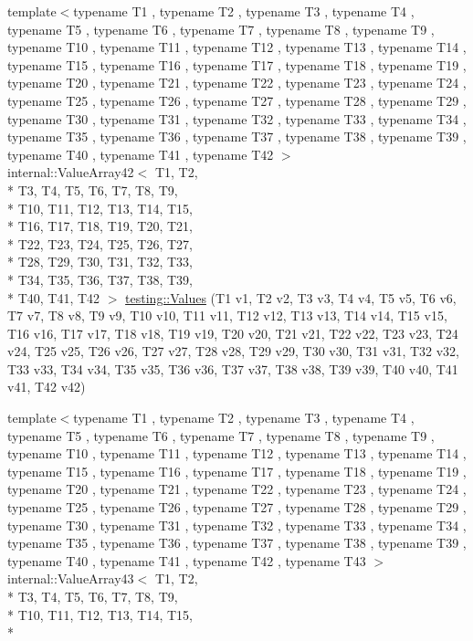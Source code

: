 \begin{DoxyCompactItemize}
{\footnotesize template$<$typename T1 , typename T2 , typename T3 , typename T4 , typename T5 , typename T6 , typename T7 , typename T8 , typename T9 , typename T10 , typename T11 , typename T12 , typename T13 , typename T14 , typename T15 , typename T16 , typename T17 , typename T18 , typename T19 , typename T20 , typename T21 , typename T22 , typename T23 , typename T24 , typename T25 , typename T26 , typename T27 , typename T28 , typename T29 , typename T30 , typename T31 , typename T32 , typename T33 , typename T34 , typename T35 , typename T36 , typename T37 , typename T38 , typename T39 , typename T40 , typename T41 , typename T42 $>$ }\\internal\-::\-Value\-Array42$<$ T1, T2, \\*
T3, T4, T5, T6, T7, T8, T9, \\*
T10, T11, T12, T13, T14, T15, \\*
T16, T17, T18, T19, T20, T21, \\*
T22, T23, T24, T25, T26, T27, \\*
T28, T29, T30, T31, T32, T33, \\*
T34, T35, T36, T37, T38, T39, \\*
T40, T41, T42 $>$ \hyperlink{namespacetesting_a0951fc3989cde27914791eb120f8f01c}{testing\-::\-Values} (T1 v1, T2 v2, T3 v3, T4 v4, T5 v5, T6 v6, T7 v7, T8 v8, T9 v9, T10 v10, T11 v11, T12 v12, T13 v13, T14 v14, T15 v15, T16 v16, T17 v17, T18 v18, T19 v19, T20 v20, T21 v21, T22 v22, T23 v23, T24 v24, T25 v25, T26 v26, T27 v27, T28 v28, T29 v29, T30 v30, T31 v31, T32 v32, T33 v33, T34 v34, T35 v35, T36 v36, T37 v37, T38 v38, T39 v39, T40 v40, T41 v41, T42 v42)
\item 
{\footnotesize template$<$typename T1 , typename T2 , typename T3 , typename T4 , typename T5 , typename T6 , typename T7 , typename T8 , typename T9 , typename T10 , typename T11 , typename T12 , typename T13 , typename T14 , typename T15 , typename T16 , typename T17 , typename T18 , typename T19 , typename T20 , typename T21 , typename T22 , typename T23 , typename T24 , typename T25 , typename T26 , typename T27 , typename T28 , typename T29 , typename T30 , typename T31 , typename T32 , typename T33 , typename T34 , typename T35 , typename T36 , typename T37 , typename T38 , typename T39 , typename T40 , typename T41 , typename T42 , typename T43 $>$ }\\internal\-::\-Value\-Array43$<$ T1, T2, \\*
T3, T4, T5, T6, T7, T8, T9, \\*
T10, T11, T12, T13, T14, T15, \\*

\end{DoxyCompactItemize}
